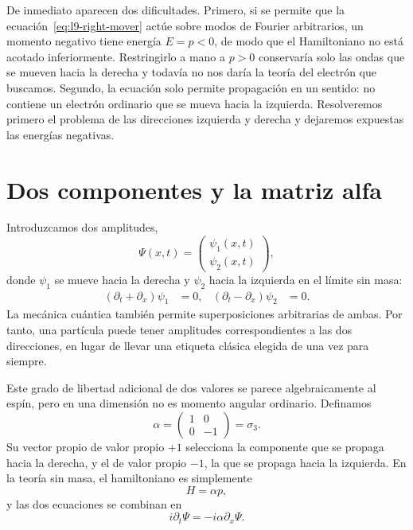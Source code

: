 De inmediato aparecen dos dificultades. Primero, si se permite que la ecuación~\eqref{eq:l9-right-mover} actúe sobre modos de Fourier arbitrarios, un momento negativo tiene energía \(E=p<0\), de modo que el Hamiltoniano no está acotado inferiormente. Restringirlo a mano a \(p>0\) conservaría solo las ondas que se mueven hacia la derecha y todavía no nos daría la teoría del electrón que buscamos. Segundo, la ecuación solo permite propagación en un sentido: no contiene un electrón ordinario que se mueva hacia la izquierda. Resolveremos primero el problema de las direcciones izquierda y derecha y dejaremos expuestas las energías negativas.

\section{Dos componentes y la matriz alfa}

Introduzcamos dos amplitudes,
\begin{equation}
\Psi(x,t)=
\begin{pmatrix}
\psi_1(x,t)\\[3pt]
\psi_2(x,t)
\end{pmatrix},
\end{equation}
donde \(\psi_1\) se mueve hacia la derecha y \(\psi_2\) hacia la izquierda en el límite sin masa:
\begin{align}
(\partial_t+\partial_x)\psi_1&=0,
&
(\partial_t-\partial_x)\psi_2&=0.
\end{align}
La mecánica cuántica también permite superposiciones arbitrarias de ambas. Por tanto, una partícula puede tener amplitudes correspondientes a las dos direcciones, en lugar de llevar una etiqueta clásica elegida de una vez para siempre.

Este grado de libertad adicional de dos valores se parece algebraicamente al espín, pero en una dimensión no es momento angular ordinario. Definamos
\begin{equation}
\alpha=
\begin{pmatrix}
1&0\\
0&-1
\end{pmatrix}
=\sigma_3.
\label{eq:l9-alpha}
\end{equation}
Su vector propio de valor propio \(+1\) selecciona la componente que se propaga hacia la derecha, y el de valor propio \(-1\), la que se propaga hacia la izquierda. En la teoría sin masa, el hamiltoniano es simplemente
\begin{equation}
H=\alpha p,
\end{equation}
y las dos ecuaciones se combinan en
\begin{equation}
i\partial_t\Psi=-i\alpha\partial_x\Psi.
\label{eq:l9-massless-dirac}
\end{equation}

